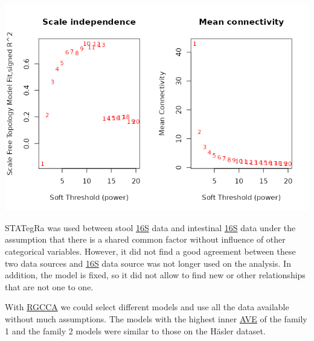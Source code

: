 \documentclass[
  12pt,
  a4paper,
  twoside,
  openright]{book}
\let\origfigure\figure
\let\endorigfigure\endfigure
\renewenvironment{figure}[1][2] {
    \expandafter\origfigure\expandafter[!htbp]
} {
    \endorigfigure
}
\begin{document}
\begin{figure}
\includegraphics[width=1\linewidth]{images/hsct-wgcna-power} \caption[Power evaluation of WGCNA of the HSCT dataset.]{Power evaluation of WGCNA of the HSCT dataset. On the ordinate the power on the abscissa on the left the scale free topology model fit; on the right the mean connectivity. There is a low fit even on large power and the mean connectivity is below 100 from the very first value.}\label{fig:hsct-wgcna-power}
\end{figure}

STATegRa was used between stool \protect\hyperlink{acronyms_16S}{16S} data and intestinal \protect\hyperlink{acronyms_16S}{16S} data under the assumption that there is a shared common factor without influence of other categorical variables.
However, it did not find a good agreement between these two data sources and \protect\hyperlink{acronyms_16S}{16S} data source was not longer used on the analysis.
In addition, the model is fixed, so it did not allow to find new or other relationships that are not one to one.

With \protect\hyperlink{acronyms_RGCCA}{RGCCA} we could select different models and use all the data available without much assumptions.
The models with the highest inner \protect\hyperlink{acronyms_AVE}{AVE} of the family 1 and the family 2 models were similar to those on the Häsler dataset.
\end{document}
